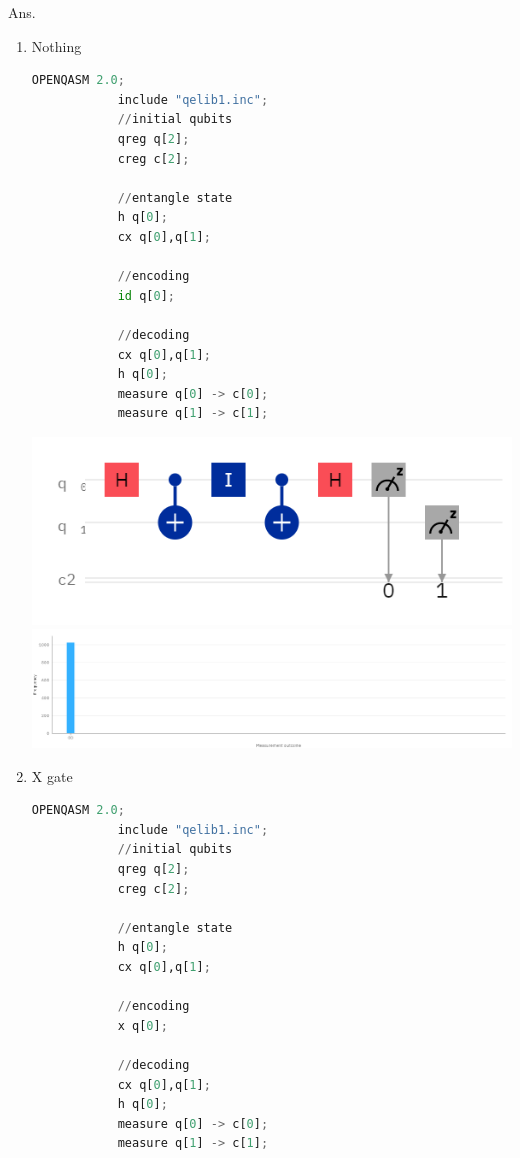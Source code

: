 \documentclass[12pt, a4paper]{article}
\begin{document}
\newpage
	Ans.
	\begin{enumerate}
		\item Nothing
		\centering
			\begin{lstlisting}[language=Python, caption= Superdense Coding (Nothing)]
			OPENQASM 2.0;
			include "qelib1.inc";
			//initial qubits
			qreg q[2];
			creg c[2];
			
			//entangle state
			h q[0];
			cx q[0],q[1];
			
			//encoding
			id q[0];
			
			//decoding
			cx q[0],q[1];
			h q[0];
			measure q[0] -> c[0];
			measure q[1] -> c[1];
		\end{lstlisting}

			\includegraphics[scale=0.5]{circuit-i.png}
			\includegraphics[scale=0.3]{bar-i.png}
			
		\newpage	
		\item X gate
		
					\begin{lstlisting}[language=Python, caption= Superdense Coding (X-gate)]
			OPENQASM 2.0;
			include "qelib1.inc";
			//initial qubits
			qreg q[2];
			creg c[2];
			
			//entangle state
			h q[0];
			cx q[0],q[1];
			
			//encoding
			x q[0];
			
			//decoding
			cx q[0],q[1];
			h q[0];
			measure q[0] -> c[0];
			measure q[1] -> c[1];
		\end{lstlisting}
	

\end{enumerate}
\end{document}
